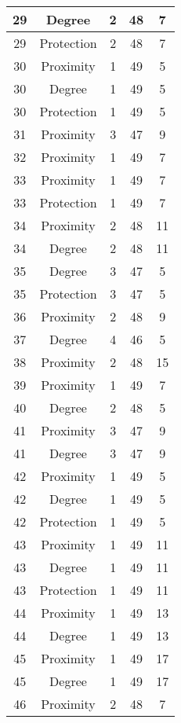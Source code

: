 \documentclass[results.tex]{subfiles}
\begin{document}
\begin{center}
\begin{tabular}{| c || c | c | c | c |}
    29 & Degree & 2 & 48 & 7 \\ 
    \hline
    29 & Protection & 2 & 48 & 7 \\ 
    \hline
    30 & Proximity & 1 & 49 & 5 \\ 
    \hline
    30 & Degree & 1 & 49 & 5 \\ 
    \hline
    30 & Protection & 1 & 49 & 5 \\ 
    \hline
    31 & Proximity & 3 & 47 & 9 \\ 
    \hline
    32 & Proximity & 1 & 49 & 7 \\ 
    \hline
    33 & Proximity & 1 & 49 & 7 \\ 
    \hline
    33 & Protection & 1 & 49 & 7 \\ 
    \hline
    34 & Proximity & 2 & 48 & 11 \\ 
    \hline
    34 & Degree & 2 & 48 & 11 \\ 
    \hline
    35 & Degree & 3 & 47 & 5 \\ 
    \hline
    35 & Protection & 3 & 47 & 5 \\ 
    \hline
    36 & Proximity & 2 & 48 & 9 \\ 
    \hline
    37 & Degree & 4 & 46 & 5 \\ 
    \hline
    38 & Proximity & 2 & 48 & 15 \\ 
    \hline
    39 & Proximity & 1 & 49 & 7 \\ 
    \hline
    40 & Degree & 2 & 48 & 5 \\ 
    \hline
    41 & Proximity & 3 & 47 & 9 \\ 
    \hline
    41 & Degree & 3 & 47 & 9 \\ 
    \hline
    42 & Proximity & 1 & 49 & 5 \\ 
    \hline
    42 & Degree & 1 & 49 & 5 \\ 
    \hline
    42 & Protection & 1 & 49 & 5 \\ 
    \hline
    43 & Proximity & 1 & 49 & 11 \\ 
    \hline
    43 & Degree & 1 & 49 & 11 \\ 
    \hline
    43 & Protection & 1 & 49 & 11 \\ 
    \hline
    44 & Proximity & 1 & 49 & 13 \\ 
    \hline
    44 & Degree & 1 & 49 & 13 \\ 
    \hline
    45 & Proximity & 1 & 49 & 17 \\ 
    \hline
    45 & Degree & 1 & 49 & 17 \\ 
    \hline
    46 & Proximity & 2 & 48 & 7 \\ 

\end{tabular}
\end{center}
\end{document}

